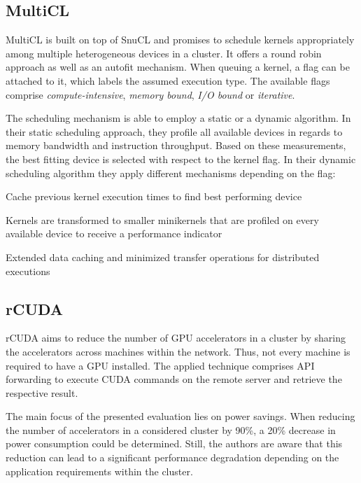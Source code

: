\subsection*{MultiCL}

MultiCL is built on top of SnuCL and promises to schedule kernels appropriately among multiple heterogeneous devices in a cluster\cite{multicl}. It offers a round robin approach as well as an autofit mechanism. When queuing a kernel, a flag can be attached to it, which labels the assumed execution type. The available flags comprise \textit{compute-intensive}, \textit{memory bound}, \textit{I/O bound} or \textit{iterative}.

The scheduling mechanism is able to employ a static or a dynamic algorithm. In their static scheduling approach, they profile all available devices in regards to memory bandwidth and instruction throughput. Based on these measurements, the best fitting device is selected with respect to the kernel flag. In their dynamic scheduling algorithm they apply different mechanisms depending on the flag:

\begin{description}[align=left,leftmargin=0cm]
\item [Iterative] Cache previous kernel execution times to find best performing device
\item [Compute-intensive] Kernels are transformed to smaller minikernels that are profiled on every available device to receive a performance indicator
\item [I/O-intensive] Extended data caching and minimized transfer operations for distributed executions
\end{description}

\subsection*{rCUDA}

rCUDA aims to reduce the number of GPU accelerators in a cluster by sharing the accelerators across machines within the network\cite{rcuda}. Thus, not every machine is required to have a GPU installed. The applied technique comprises API forwarding to execute CUDA commands on the remote server and retrieve the respective result.

The main focus of the presented evaluation lies on power savings. When reducing the number of accelerators in a considered cluster by 90\%, a 20\% decrease in power consumption could be determined. Still, the authors are aware that this reduction can lead to a significant performance degradation depending on the application requirements within the cluster.

